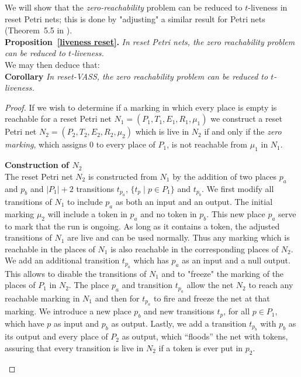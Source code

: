 \documentclass[runningheads]{llncs}
\begin{document}
We will show that the {\em zero-reachability} problem can be reduced to {\sc $t$-liveness} in reset Petri nets; this is done by "adjusting" a similar result for Petri nets (Theorem~5.5 in  \cite{peterson1981petri}).\\



\noindent
\textbf{Proposition~\ref{liveness reset}.}
{\em In reset Petri nets, the zero reachability problem can be reduced to {\sc $t$-liveness}.}\\

We may then deduce that:\\

\noindent
\textbf{Corollary}
{\em In reset-VASS, the zero reachability problem can be reduced to {\sc $t$-liveness}.}


\begin{proof}


If we wish to determine if a marking in which every place is empty is reachable for a reset Petri net
 $N_1 = (P_1, T_1, E_1, R_1, \mu_1)$ 
 we construct a reset Petri net
 $N_2 = (P_2, T_2, E_2, R_2, \mu_2)$ 
  which is live in $N_2$ if and only if the {\em zero marking}, which assigns $0$ to every place of $P_1$, is not reachable from $\mu_1$ in $N_1$. \\

\begin{samepage}
{\bf Construction of $N_2$} \\
\indent
The reset Petri net $N_2$ is constructed from $N_1$ by the addition of two places $p_a$ and $p_b$ and $|P_1| +2$ transitions $t_{p_a}$, $\{ t_p \mid p \in P_1 \}$ and $t_{p_b}$.
We first modify all transitions of $N_1$ to include $p_a$ as both an input and an output.
The initial marking $\mu_2$ will include a token in $p_a$ and no token in $p_b$. 
This new place $p_a$ serve to mark that the run is ongoing. As long as it contains a token, the adjusted transitions of $N_1$ are live and can be used normally. Thus any marking which is reachable in the places of $N_1$ is also reachable in the corresponding places of $N_2$.
We add an additional transition $t_{p_a}$ 
which has $p_a$ as an input and a null output.
This allows to disable the transitions of $N_1$ and to "freeze" the marking of the places of $P_1$ in $N_2$.
 The place $p_a$ and transition $t_{p_a}$ allow the net $N_2$ to reach any reachable marking in $N_1$ and then for $t_{p_a}$ to fire and freeze the net at that marking.
We introduce a new place $p_b$ and new transitions $t_p$, for all $p \in P_1$, which have $p$ as input and $p_b$ as output.
Lastly, we add a transition $t_{p_b}$ with $p_b$ as its output and every place of $P_2$ as output, which ``floods'' the net with tokens, assuring that every transition is live in $N_2$ if a token is ever
put in $p_2$.
\end{samepage}


\end{proof}
\end{document}
